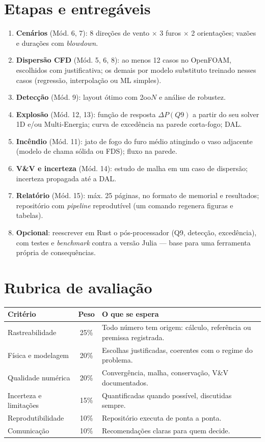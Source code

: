 \documentclass[10pt,a4paper,twocolumn,openany]{report}
\begin{document}
\section*{Etapas e entregáveis}
\begin{enumerate}
  \item \textbf{Cenários} (Mód. 6, 7): 8 direções de vento $\times$ 3 furos
        $\times$ 2 orientações; vazões e durações com \emph{blowdown}.
  \item \textbf{Dispersão CFD} (Mód. 5, 6, 8): ao menos 12 casos no OpenFOAM,
        escolhidos com justificativa; os demais por modelo substituto treinado
        nesses casos (regressão, interpolação ou ML simples).
  \item \textbf{Detecção} (Mód. 9): layout ótimo com 2oo$N$ e análise de robustez.
  \item \textbf{Explosão} (Mód. 12, 13): função de resposta $\Delta P(Q9)$
        a partir do seu solver 1D e/ou Multi-Energia; curva de excedência na
        parede corta-fogo; DAL.
  \item \textbf{Incêndio} (Mód. 11): jato de fogo do furo médio atingindo o
        vaso adjacente (modelo de chama sólida ou FDS); fluxo na parede.
  \item \textbf{V\&V e incerteza} (Mód. 14): estudo de malha em um caso de
        dispersão; incerteza propagada até a DAL.
  \item \textbf{Relatório} (Mód. 15): máx. 25 páginas, no formato de memorial
        e resultados; repositório com \emph{pipeline} reprodutível (um comando
        regenera figuras e tabelas).
  \item \textbf{Opcional}: reescrever em Rust o pós-processador (Q9,
        detecção, excedência), com testes e \emph{benchmark} contra a versão
        Julia --- base para uma ferramenta própria de consequências.
\end{enumerate}

\section*{Rubrica de avaliação}
\begin{center}
\small
\begin{tabularx}{\linewidth}{@{}lcX@{}}
\toprule
Critério & Peso & O que se espera\\
\midrule
Rastreabilidade & 25\% & Todo número tem origem: cálculo, referência ou premissa registrada.\\
Física e modelagem & 20\% & Escolhas justificadas, coerentes com o regime do problema.\\
Qualidade numérica & 20\% & Convergência, malha, conservação, V\&V documentados.\\
Incerteza e limitações & 15\% & Quantificadas quando possível, discutidas sempre.\\
Reprodutibilidade & 10\% & Repositório executa de ponta a ponta.\\
Comunicação & 10\% & Recomendações claras para quem decide.\\
\bottomrule
\end{tabularx}
\end{center}
\end{document}
